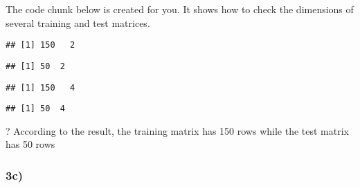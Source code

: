 \documentclass[
]{article}
\newenvironment{Shaded}{\begin{snugshade}}{\end{snugshade}}
\newcommand{\DecValTok}[1]{\textcolor[rgb]{0.00,0.00,0.81}{#1}}
\newcommand{\FunctionTok}[1]{\textcolor[rgb]{0.00,0.00,0.00}{#1}}
\newcommand{\NormalTok}[1]{#1}
\newcommand{\SpecialCharTok}[1]{\textcolor[rgb]{0.00,0.00,0.00}{#1}}
\begin{document}
The code chunk below is created for you. It shows how to check the
dimensions of several training and test matrices.

\begin{Shaded}
\end{Shaded}

\begin{verbatim}
## [1] 150   2
\end{verbatim}

\begin{Shaded}
\end{Shaded}

\begin{verbatim}
## [1] 50  2
\end{verbatim}

\begin{Shaded}
\end{Shaded}

\begin{verbatim}
## [1] 150   4
\end{verbatim}

\begin{Shaded}
\end{Shaded}

\begin{verbatim}
## [1] 50  4
\end{verbatim}

? According to the result, the training matrix has 150 rows while the
test matrix has 50 rows

\hypertarget{c-2}{%
\subsubsection{3c)}\label{c-2}}
\end{document}
